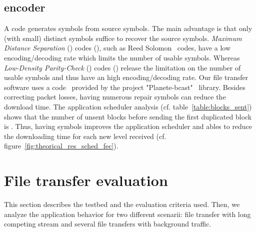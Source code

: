 \documentclass[a4paper]{article}
\begin{document}
    \subsection{ encoder}
        A  code generates  symbols from  source symbols.  The main
        advantage is that only  (with  small) distinct
        symbols suffice to recover the  source symbols.
\textit{Maximum Distance Separation} () codes (),
        such as Reed Solomon~\cite{rizzo_effective_1997} codes, have a low
        encoding/decoding rate which limits the
        number of usable symbols.
Whereas \textit{Low-Density Parity-Check} () codes () release the limitation on the number of usable symbols and
        thus have an high encoding/decoding rate. Our file transfer software
        uses a  code~\cite{roca_design_2003} provided by the
        project "Planete-bcast"~\cite{_planete-bcast:_2006} library.
Besides correcting packet losses, having numerous repair symbols can
        reduce the download time.  The application scheduler analysis (cf.
                table~\ref{table:blocks_sent}) shows that the number of unsent
        blocks before sending the first duplicated block is .  Thus,
        having  symbols improves the application scheduler and ables
        to reduce the downloading time for each new level received (cf.
                figure~\ref{fig:theorical_res_sched_fec}).

\section{File transfer evaluation}
    This section describes the testbed and the evaluation criteria used. Then,
    we analyze the application behavior for two different scenarii:
     file transfer with  long competing stream and several file transfers
    with background traffic.
\end{document}
